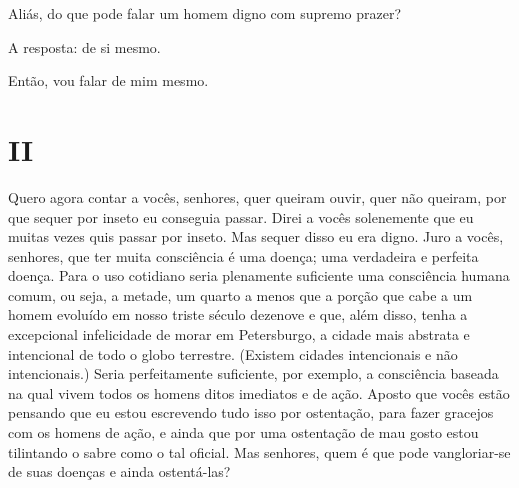 Aliás, do que pode falar um homem digno com supremo prazer?

A resposta: de si mesmo.

Então, vou falar de mim mesmo.


\section{II}

Quero agora contar a vocês, senhores, quer queiram ouvir, quer não
queiram, por que sequer por inseto eu conseguia passar. Direi a vocês
solenemente que eu muitas vezes quis passar por inseto. Mas sequer
disso eu era digno. Juro a vocês, senhores, que ter muita consciência é
uma doença; uma verdadeira e perfeita doença. Para o uso cotidiano
seria plenamente suficiente uma consciência humana comum, ou seja, a
metade, um quarto a menos que a porção que cabe a um homem evoluído em
nosso triste século dezenove e que, além disso, tenha a excepcional
infelicidade de morar em Petersburgo, a cidade mais abstrata e
intencional de todo o globo terrestre. (Existem cidades intencionais e
não intencionais.) Seria perfeitamente suficiente, por exemplo, a
consciência baseada na qual vivem todos os homens ditos imediatos e de
ação. Aposto que vocês estão pensando que eu estou escrevendo tudo isso
por ostentação, para fazer gracejos com os homens de ação, e ainda que
por uma ostentação de mau gosto estou tilintando o sabre como o tal
oficial. Mas senhores, quem é que pode vangloriar-se de suas doenças e
ainda ostentá-las?


